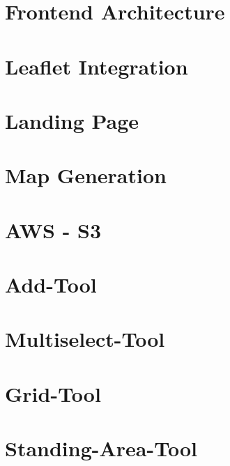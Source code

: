 \section{Frontend Architecture}


\section{Leaflet Integration}


\section{Landing Page}


\section{Map Generation}


\section{AWS - S3}


\section{Add-Tool}


\section{Multiselect-Tool}


\section{Grid-Tool}
\label{sec:grid-tool}


\section{Standing-Area-Tool}

